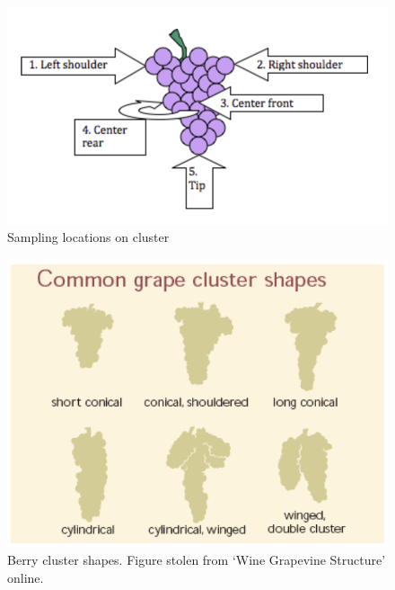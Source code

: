 \documentclass[11pt,letter]{article}
\begin{document}
\begin{enumerate}
\begin{figure} [h]
  \includegraphics[scale = .75]{conecluster.png}
  \caption{Sampling locations on cluster }
  \label{fig:conecluster}
\end{figure}

\begin{figure} [h]
  \includegraphics[scale = .75]{clustershapes}
  \caption{Berry cluster shapes. Figure stolen from ‘Wine Grapevine Structure’ online.}
  \label{fig:clustershapes}
\end{figure}


\end{enumerate}
\end{document}
